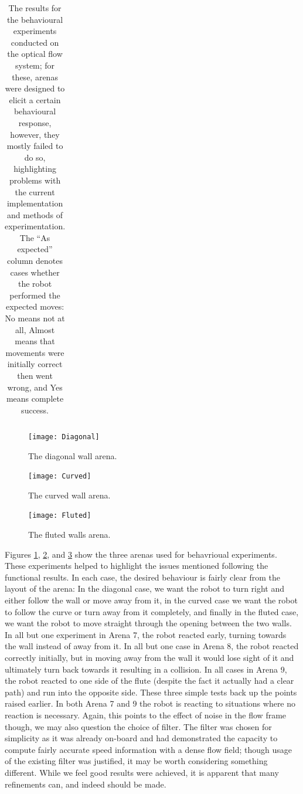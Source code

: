 \documentclass[a4paper,12pt]{article}
\begin{document}
\begin{center}
\begin{table}
\begin{tabular}{|l|l|l|l|l|l|l|l|l|l|}
   \end{tabular}
   \caption{The results for the behavioural experiments conducted on the optical flow system; for these, arenas were designed to
     elicit a certain behavioural response, however, they mostly failed to do so, highlighting problems with the current implementation
     and methods of experimentation. The ``As expected'' column denotes cases whether the robot performed the expected moves: No means
     not at all, Almost means that movements were initially correct then went wrong, and Yes means complete success.
    }
    \label{tab:ofrestwo}
  \end{table}
\end{center}

\begin{figure}
  \centering
  \texttt{[image: Diagonal]}
  \caption{
    \label{fig:diag} The diagonal wall arena.
  }
\end{figure}

\begin{figure}
  \centering
  \texttt{[image: Curved]}
  \caption{
    \label{fig:curved} The curved wall arena.
  }
\end{figure}

\begin{figure}
  \centering
  \texttt{[image: Fluted]}
  \caption{
    \label{fig:fluted} The fluted walls arena.
  }
\end{figure}

Figures \ref{fig:diag}, \ref{fig:curved}, and \ref{fig:fluted} show the three arenas used for behavrioual experiments. These experiments
helped to highlight the issues mentioned following the functional results. In each case, the desired behaviour is fairly clear from the layout of
the arena: In the diagonal case, we want the robot to turn right and either follow the wall or move away from it, in the curved case we want the
robot to follow the curve or turn away from it completely, and finally in the fluted case, we want the robot to move straight through the
opening between the two walls. In all but one experiment in Arena 7, the robot reacted early, turning towards the wall instead of away from it.
In all but one case in Arena 8, the robot reacted correctly initially, but in moving away from the wall it would lose sight of it and ultimately
turn back towards it resulting in a collision. In all cases in Arena 9, the robot reacted to one side of the flute (despite the fact it actually
had a clear path) and run into the opposite side. These three simple tests back up the points raised earlier. In both Arena 7 and 9 the robot
is reacting to situations where no reaction is necessary. Again, this points to the effect of noise in the flow frame though, we may also
question the choice of filter. The filter was chosen for simplicity as it was already on-board and had demonstrated the capacity to compute
fairly accurate speed information \cite{Scimeca2017} with a dense flow field; though usage of the existing filter was justified,
it may be worth considering something different. While we feel good results were achieved, it is apparent that many refinements can, and indeed should
be made.
\end{document}
